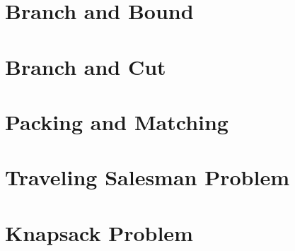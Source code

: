 	\chapter{Branch and Bound}

	\chapter{Branch and Cut}

	\chapter{Packing and Matching}

	\chapter{Traveling Salesman Problem}

	\chapter{Knapsack Problem}